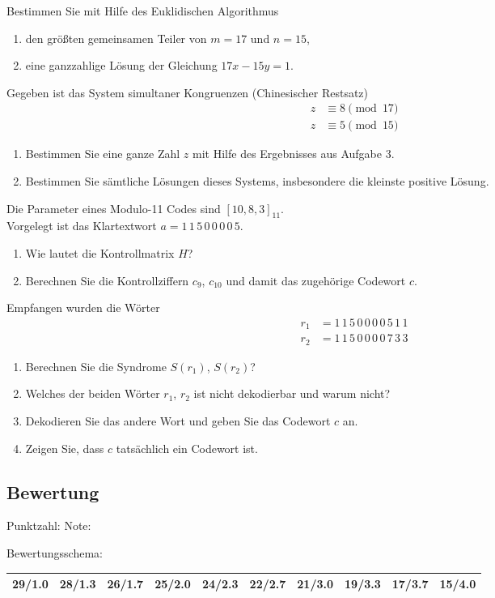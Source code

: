 \begin{aufgabe}[Aufgabe 3]
Bestimmen Sie mit Hilfe des Euklidischen Algorithmus
\begin{enumerate}[label=\alph*)]
  \item den größten gemeinsamen Teiler von $m = 17$ und $n = 15$,
  \item eine ganzzahlige Lösung der Gleichung $17x - 15y = 1$.
\end{enumerate}
\end{aufgabe}

\begin{aufgabe}[Aufgabe 4]
Gegeben ist das System simultaner Kongruenzen (Chinesischer Restsatz)
\begin{align*}
  z &\equiv 8 \pmod{17}\\
  z &\equiv 5 \pmod{15}
\end{align*}
\begin{enumerate}[label=\alph*)]
  \item Bestimmen Sie eine ganze Zahl $z$ mit Hilfe des Ergebnisses aus Aufgabe 3.
  \item Bestimmen Sie sämtliche Lösungen dieses Systems, insbesondere die kleinste positive Lösung.
\end{enumerate}
\end{aufgabe}

\begin{aufgabe}[Aufgabe 5]
Die Parameter eines Modulo-11 Codes sind $[10, 8, 3]_{11}$.\\
Vorgelegt ist das Klartextwort $a = 1\,1\,5\,0\,0\,0\,0\,5$.
\begin{enumerate}[label=\alph*)]
  \item Wie lautet die Kontrollmatrix $H$?
  \item Berechnen Sie die Kontrollziffern $c_9$, $c_{10}$ und damit das zugehörige Codewort $c$.
\end{enumerate}
Empfangen wurden die Wörter
\begin{align*}
  r_1 &= 1\,1\,5\,0\,0\,0\,0\,5\,1\,1\\
  r_2 &= 1\,1\,5\,0\,0\,0\,0\,7\,3\,3
\end{align*}
\begin{enumerate}[label=\alph*), start=3]
  \item Berechnen Sie die Syndrome $S(r_1)$, $S(r_2)$?
  \item Welches der beiden Wörter $r_1$, $r_2$ ist nicht dekodierbar und warum nicht?
  \item Dekodieren Sie das andere Wort und geben Sie das Codewort $c$ an.
  \item Zeigen Sie, dass $c$ tatsächlich ein Codewort ist.
\end{enumerate}
\end{aufgabe}

\subsection{Bewertung}
Punktzahl: \qquad Note:

\noindent Bewertungsschema:

\begin{tabular}{*{10}{c}}
\toprule
29/1.0 & 28/1.3 & 26/1.7 & 25/2.0 & 24/2.3 & 22/2.7 & 21/3.0 & 19/3.3 & 17/3.7 & 15/4.0\\
\bottomrule
\end{tabular}
